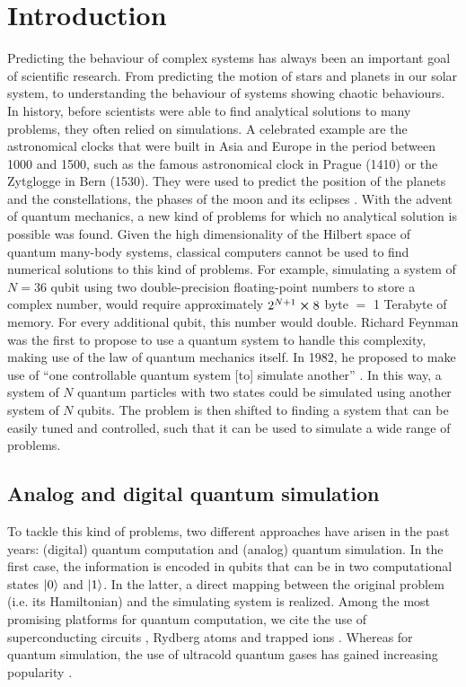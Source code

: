 \chapter{Introduction}

Predicting the behaviour of complex systems has always been an important goal of scientific research. From predicting the motion of stars and planets in our solar system, to understanding the behaviour of systems showing chaotic behaviours. In history, before scientists were able to find analytical solutions to many problems, they often relied on simulations. A
celebrated example are the astronomical clocks that
were built in Asia and Europe in the period between 1000 and
1500, such as the famous astronomical clock in Prague (1410) or the Zytglogge in Bern (1530). They were used to predict the position of the planets and the constellations, the phases of the moon and its eclipses \cite{bloch2012}.
With the advent of quantum mechanics, a new kind of problems for which no analytical solution is possible was found. Given the high dimensionality of the Hilbert space of quantum many-body systems, classical computers cannot be used to find numerical solutions to this kind of problems. For example, simulating a system of $N=36$ qubit using two double-precision floating-point numbers to store a complex number, would require approximately $2^{N+1} \cross 8$ byte $=$ 1 Terabyte of memory. For every additional qubit, this number would double.
Richard Feynman was the first to propose to use a quantum system to handle this complexity, making use of the law of quantum mechanics itself. In 1982, he proposed to make use of \enquote{one controllable quantum system [to] simulate another} \cite{feynman1982}. In this way, a system of $N$ quantum particles with two states could be simulated using another system of $N$ qubits. The problem is then shifted to finding a system that can be easily tuned and controlled, such that it can be used to simulate a wide range of problems.

\section{Analog and digital quantum simulation}

To tackle this kind of problems, two different approaches have arisen in the past years: (digital) quantum computation and (analog) quantum simulation. In the first case, the information is encoded in qubits that can be in two computational states $\ket{0}$ and $\ket{1}$. In the latter, a direct mapping between the original problem (i.e. its Hamiltonian) and the simulating system is realized. Among the most promising platforms for quantum computation, we cite the use of superconducting circuits \cite{blais2021a}, Rydberg atoms \cite{wu2021a} and trapped ions \cite{bruzewicz2019}. Whereas for quantum simulation, the use of ultracold quantum gases has gained increasing popularity \cite{bloch2012}.

